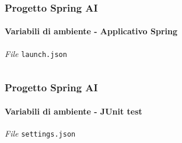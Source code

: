 \begin{frame}[t,fragile]
\begin{minipage}[b]{\textwidth}
{\begin{figure}[ht]
		    \end{figure}
        }
	\end{minipage}
\end{frame}
%
\begin{frame}[t,fragile] \frametitle{Progetto Spring AI}
    \framesubtitle{Variabili di ambiente - Applicativo Spring}
        \begin{block}{\textit{File} \texttt{launch.json}}
			{\tiny\inputminted{json}{code/launch.json}}
    	\end{block}
\end{frame}
%
\begin{frame}[t,fragile] \frametitle{Progetto Spring AI}
    \framesubtitle{Variabili di ambiente - JUnit test}
        \begin{block}{\textit{File} \texttt{settings.json}}
			{\tiny\inputminted{json}{code/settings.json}}
    	\end{block}
\end{frame}
